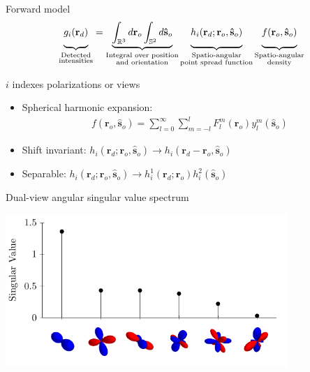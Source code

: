 \documentclass[presentation]{beamer}
\providecommand{\ro}[1]{\mathbf{r}_o}
\providecommand{\so}[1]{\mathbf{\hat{s}}_o}
\providecommand{\ro}[1]{\mathbf{\mathfrak{r}}_o}
\providecommand{\so}[1]{\mathbf{\hat{s}}_o}
\providecommand{\rd}[1]{\mathbf{r}_d}
\begin{document}
\begin{frame}{Forward model}
  \begin{align*}
    \underbrace{\vphantom{\int_{\mathbb{R}^3}}g_i(\rd{})}_{\substack{\text{Detected} \\ \text{intensities}}}
    =
    \underbrace{\int_{\mathbb{R}^3}d\ro{} \int_{\mathbb{S}^2}d\so{}}_{\substack{\text{Integral over position} \\ \text{and orientation}}}
    \underbrace{\vphantom{\int_{\mathbb{R}^3}}h_i(\rd{}; \ro{}, \so{})}_{\substack{\text{Spatio-angular}\\ \text{point spread function}}}
    \underbrace{\vphantom{\int_{\mathbb{R}^3}}f(\ro{}, \so{})}_{\substack{\text{Spatio-angular}\\ \text{density}}}
  \end{align*}
  \begin{center}
    \vspace{1em}
    \small{$i$ indexes polarizations or views}
  \end{center}
  
  \begin{itemize}
  \item Spherical harmonic expansion: \begin{align*}f(\ro{}, \so{}) = \sum_{l=0}^{\infty}\sum_{m=-l}^{l}F_l^m(\ro{})y_l^m(\so{}) \end{align*}
  \item Shift invariant: $h_i(\rd{}; \ro{}, \so{}) \rightarrow h_i(\rd{} - \ro{}, \so{})$
  \item Separable: $h_i(\rd{}; \ro{}, \so{}) \rightarrow h_i^1(\rd{}; \ro{})h_i^2(\so{})$
  \end{itemize}
\end{frame}

\begin{frame}[label=sec-1]{Dual-view angular singular value spectrum}
 \begin{center}
   \includegraphics[width=0.8\textwidth]{figs/svs_dispim.pdf}
 \end{center}
\end{frame}
\end{document}
